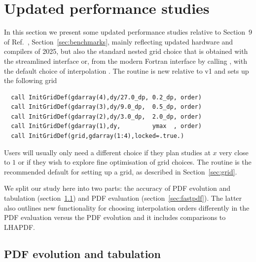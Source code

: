 \section{Updated performance studies}
\label{sec:v2-performance}

In this section we present some updated performance studies relative
to
%
\ifreleasenote
Section~9 of Ref.~\cite{Salam:2008qg},
\else
Section~\ref{sec:benchmarks},
\fi
mainly reflecting updated hardware and compilers of 2025, but also the
standard nested grid choice that is obtained with the streamlined
interface or, from the modern Fortran interface by calling
, with the default
choice of interpolation .
%
\ifreleasenote
The  routine is new relative to v1 and sets up
the following grid
\begin{lstlisting}
  call InitGridDef(gdarray(4),dy/27.0_dp, 0.2_dp, order)
  call InitGridDef(gdarray(3),dy/9.0_dp,  0.5_dp, order)
  call InitGridDef(gdarray(2),dy/3.0_dp,  2.0_dp, order)
  call InitGridDef(gdarray(1),dy,         ymax  , order)
  call InitGridDef(grid,gdarray(1:4),locked=.true.)
\end{lstlisting}
Users will usually only need a different choice if they plan studies
at $x$ very close to $1$ or if they wish to explore fine optimisation of
grid choices.
\else
  The  routine is the recommended default
  for setting up a grid, as described in Section~\ref{sec:grid}.
\fi

We split our study here into two parts: the accuracy of PDF evolution
and tabulation (section~\ref{sec:acc-pdf-evol}) and PDF evaluation
(section~\ref{sec:fastpdf}).
%
The latter also outlines new functionality for choosing interpolation
orders differently in the PDF evaluation versus the PDF evolution and
it includes comparisons to LHAPDF.


\subsection{PDF evolution and tabulation}
\label{sec:acc-pdf-evol}

